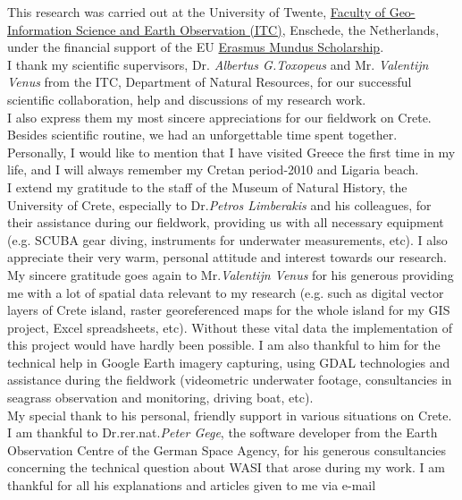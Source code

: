 \documentclass[10pt, a4paper]{article}
\begin{document}
This research was carried out at the University of Twente, \href{http://www.itc.nl/}{Faculty of Geo-Information Science and Earth Observation (ITC)}, Enschede, the Netherlands, under the financial support of the EU \href{http://ec.europa.eu/education/external-relation-programmes/doc72_en.htm}{Erasmus Mundus Scholarship}. 
\vspace{1mm}\\
I thank my scientific supervisors, Dr. \textit{Albertus G.Toxopeus}  and Mr. \textit{Valentijn Venus} from the ITC, Department of Natural Resources, for our successful scientific collaboration, help and discussions of my research work. \\
I also express them my most sincere appreciations for our fieldwork on Crete. \\ Besides scientific routine, we had an unforgettable time spent together. \\ Personally, I would like to mention that I have visited Greece the first time in my life, and I will always remember my Cretan period-2010 and Ligaria beach.\vspace{1mm}\\
I extend my gratitude to the staff of the Museum of Natural History, the University of Crete, especially to Dr.\textit{Petros Limberakis} and his colleagues, for their assistance during our fieldwork, providing us with all necessary equipment (e.g. SCUBA gear diving, instruments for underwater measurements, etc). I also appreciate their very warm, personal attitude and interest towards our research. 
\vspace{1mm}\\
My sincere gratitude goes again to Mr.\textit{Valentijn Venus} for his generous providing me with a lot of spatial data   relevant to my research (e.g. such as digital vector layers of Crete island, raster georeferenced maps for the whole island for my GIS project, Excel spreadsheets, etc). Without these vital data the implementation of this project would have hardly been possible. I am also thankful to him for the technical help in Google Earth imagery capturing, using GDAL technologies and assistance during the fieldwork (videometric underwater footage, consultancies in seagrass observation and monitoring, driving boat, etc). \\ My special thank to his personal, friendly support in various situations on Crete.\vspace{1mm}\\
I am thankful to Dr.rer.nat.\textit{Peter Gege}, the software developer from the Earth Observation Centre of the German Space Agency, for his generous consultancies concerning the technical question about WASI that arose during my work. I am thankful for all his explanations and articles given to me via e-mail \vspace{1mm}\\
\end{document}
